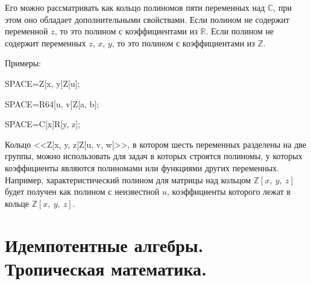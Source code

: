 Его можно рассматривать как кольцо полиномов пяти переменных над $\mathbb{C}$,  при этом оно обладает дополнительными
свойствами.  Если полином не содержит переменной $z$,  то это полином с коэффициентами из $\mathbb{R}$.  Если
полином не содержит переменных $z$, $x$, $y$,  то это полином с коэффициентами из $\mathbb{Z}$. 


Примеры: 

SPACE=Z[x, y]Z[u]; 

SPACE=R64[u, v]Z[a, b]; 

SPACE=C[x]R[y, z]; 

 

 Кольцо <<Z[x, y, z]Z[u, v, w]>>,  в котором шесть переменных разделены
на две группы,  можно использовать для задач в которых строятся полиномы,  у которых коэффициенты
являются полиномами или функциями других переменных. 
Например,  характеристический полином для матрицы над кольцом $\mathbb{Z}[x,\ y,\ z]$ будет получен как полином
с неизвестной $u$,  коэффициенты которого лежат в кольце $\mathbb{Z}[x,\ y,\ z]$. 



 










 
 \section{Идемпотентные алгебры.  Тропическая математика. }
 
